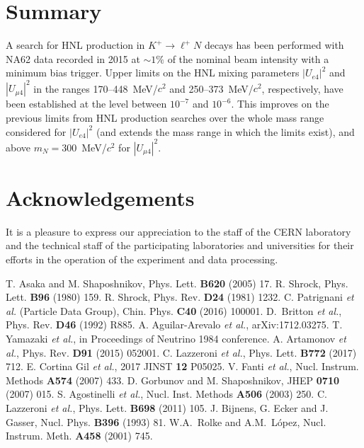\documentclass[11pt]{article}
\begin{document}

\section*{Summary}

A search for HNL production in $K^+\to\ell^+N$ decays has been performed with NA62 data  recorded in 2015 at $\sim 1\%$ of the nominal beam intensity with a minimum bias trigger. Upper limits on the HNL mixing parameters $|U_{e4}|^2$ and $|U_{\mu4}|^2$ in the ranges 170--448~MeV/$c^2$ and 250--373~MeV/$c^2$, respectively, have been established at the level between $10^{-7}$ and $10^{-6}$. This improves on the previous limits from HNL production searches over the whole mass range considered for $|U_{e4}|^2$ (and extends the mass range in which the limits exist), and above $m_N=300$~MeV/$c^2$ for $|U_{\mu4}|^2$.


\section*{Acknowledgements}

It is a pleasure to express our appreciation to the staff of the CERN laboratory and the technical staff of the participating laboratories and universities for their efforts in the operation of the experiment and data processing.





\begin{thebibliography}{99}
%
T. Asaka and M. Shaposhnikov, Phys. Lett. {\bf B620} (2005) 17.
%
R. Shrock, Phys. Lett. {\bf B96} (1980) 159.
%
R. Shrock, Phys. Rev. {\bf D24} (1981) 1232.
%
C. Patrignani {\it et al.} (Particle Data Group), Chin. Phys. {\bf C40} (2016) 100001.
%
D.~Britton {\it et al.}, Phys. Rev. {\bf D46} (1992) R885.
%
A. Aguilar-Arevalo {\it et al.}, arXiv:1712.03275.
%
T. Yamazaki {\it et al.}, in Proceedings of Neutrino 1984 conference.
%
A. Artamonov {\it et al.}, Phys. Rev. {\bf D91} (2015) 052001.
%
C. Lazzeroni {\it et al.}, Phys. Lett. {\bf B772} (2017) 712.
%
E. Cortina Gil {\it et al.}, 2017 JINST {\bf 12} P05025.
%
V. Fanti {\it et al.}, Nucl. Instrum. Methods {\bf A574} (2007) 433.
%
D. Gorbunov and M. Shaposhnikov, JHEP {\bf 0710} (2007) 015.
%
S. Agostinelli {\it et al.}, Nucl. Inst. Methods {\bf A506} (2003) 250.
%
C. Lazzeroni {\it et al.}, Phys. Lett. {\bf B698} (2011) 105.
%
J. Bijnens, G. Ecker and J. Gasser, Nucl. Phys. {\bf B396} (1993) 81.
%
W.A.~Rolke and A.M.~L\'opez, Nucl. Instrum. Meth. {\bf A458} (2001) 745.
%
\end{thebibliography}
\end{document}
